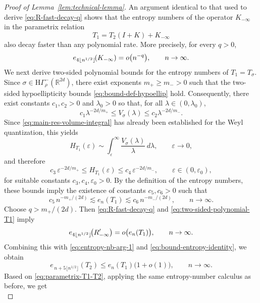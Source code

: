 \documentclass[a4paper,12pt]{article}
\let\originalleft\left
\let\originalright\right
\renewcommand{\left}{\mathopen{}\mathclose\bgroup\originalleft}
\renewcommand{\right}{\aftergroup\egroup\originalright}
\newcommand{\R}{\mathbb{R}}
\begin{document}
\begin{proof}[Proof of Lemma~\ref{lem:technical-lemma}]
An argument identical to that used to derive \eqref{eq:R-fast-decay-q} shows
that the entropy numbers of the %
operator \(K_{-\infty}\) in the
parametrix relation
\begin{equation}\label{eq:parametrix-T1-T2}
T_1 = T_2(I+K)+K_{-\infty}
\end{equation}
also decay faster than any polynomial rate. More precisely, for every \(q>0\),
\begin{equation}\label{eq:K-fast-decay-q}
    e_{4\lfloor n^{1/2}\rfloor}\!\left(K_{-\infty}\right)
    =
    o \left(n^{-q}\right),
    \qquad n\to\infty.
\end{equation}
We next derive two-sided polynomial bounds for the entropy numbers of
\(T_1=T_\sigma\).
Since $\sigma \in \mathrm{H}\Gamma^{-}_{\rho}(\R^{2d})$, there exist exponents
$m_+ \ge m_- > 0$ such that the two-sided hypoellipticity bounds
\eqref{eq:bound-def-hypoellip} hold. Consequently, there exist constants
$c_1,c_2>0$ and $\lambda_0>0$ so that, for all $\lambda\in(0,\lambda_0)$,
\[
c_1 \lambda^{-2d/m_+}
\le
V_\sigma(\lambda)
\le
c_2 \lambda^{-2d/m_-}.
\]
Since \eqref{eq:main-res-volume-integral} has already been established for the
Weyl quantization, this yields
\[
H_{T_1}(\varepsilon)
\sim
\int_\varepsilon^\infty \frac{V_\sigma(\lambda)}{\lambda}\,d\lambda,
\qquad \varepsilon\to0,
\]
and therefore
\[
c_3 \, \varepsilon^{-2d/m_+}
\le
H_{T_1}(\varepsilon)
\le
c_4 \, \varepsilon^{-2d/m_-},
\qquad \varepsilon\in(0,\varepsilon_0),
\]
for suitable constants \(c_3,c_4,\varepsilon_0>0\).
By the definition of the entropy numbers, these bounds imply the existence of
constants \(c_5,c_6>0\) such that
\begin{equation}\label{eq:two-sided-polynomial-T1}
    c_5\, n^{-m_+/(2d)}
\lesssim
    e_n(T_1)
\lesssim
    c_6\, n^{-m_-/(2d)},
    \qquad n\to\infty.
\end{equation}
Choose \(q>m_+/(2d)\). Then \eqref{eq:R-fast-decay-q} and
\eqref{eq:two-sided-polynomial-T1} imply
\[
e_{4\lfloor n^{1/2}\rfloor}\!\left(R'_{-\infty}\right)
=
o \bigl(e_n(T_1)\bigr),
\qquad n\to\infty.
\]
Combining this with \eqref{eq:entropy-nb-arg-1} and
\eqref{eq:bound-entropy-identity}, we obtain
\begin{equation}\label{eq:inequality-entropy-nbs}
    e_{\,n+5\lfloor n^{1/2}\rfloor}(T_2)
    \le
    e_n(T_1)\bigl(1+o(1)\bigr),
    \qquad n\to\infty.
\end{equation}
Based on \eqref{eq:parametrix-T1-T2}, applying the same entropy-number calculus as before, we get
\begin{equation}\label{eq:entropy-nb-arg-1-bis}

\end{equation}
\end{proof}
\end{document}
